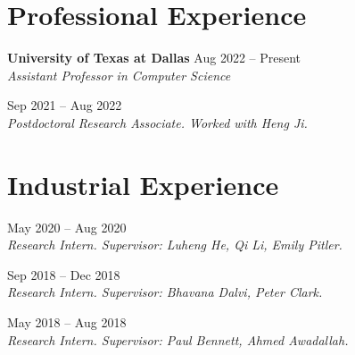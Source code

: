 
\vspace{-1mm}
\section{Professional Experience}

\noindent \textbf{University of Texas at Dallas} \hfill Aug 2022 -- Present \\
\indent \textit{Assistant Professor in Computer Science}

 \hfill Sep 2021 -- Aug 2022 \\
\indent \textit{Postdoctoral Research Associate. Worked with Heng Ji.} \\


\vspace{-1mm}
\section{Industrial Experience}

 \hfill May 2020 -- Aug 2020 \\
\indent \textit{Research Intern. Supervisor: Luheng He, Qi Li, Emily Pitler.}

 \hfill Sep 2018 -- Dec 2018 \\
\indent \textit{Research Intern. Supervisor: Bhavana Dalvi, Peter Clark.}

 \hfill May 2018 -- Aug 2018 \\
\indent \textit{Research Intern. Supervisor: Paul Bennett, Ahmed Awadallah.} \\




